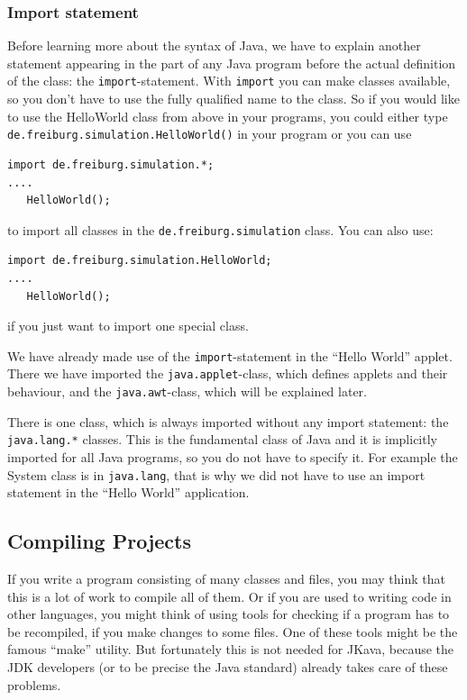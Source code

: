 \subsubsection{Import statement}
Before learning more about the syntax of Java, we have to explain another
statement appearing in the part of any Java program before the actual
definition of the class: the \verb|import|-statement. With \verb|import|
you can make classes available, so you don't have to use the fully
qualified name to the class. So if you would like to
use the HelloWorld class from above in your programs, you could either
type \verb|de.freiburg.simulation.HelloWorld()| in your program
or you can use
\begin{verbatim}
import de.freiburg.simulation.*;
....
   HelloWorld();
\end{verbatim}
to import all classes in the \verb|de.freiburg.simulation| class.
You can also use:
\begin{verbatim}
import de.freiburg.simulation.HelloWorld;
....
   HelloWorld();
\end{verbatim}
if you just want to import one special class.

We have already made use of the \verb|import|-statement in the ``Hello World'' 
applet. There we have imported the \verb|java.applet|-class, which
defines applets and their behaviour, and the \verb|java.awt|-class, which
will be explained later.
 
There is one class, which is always imported without any import statement:
the \verb|java.lang.*| classes. This is the fundamental class of Java and it is
implicitly imported for all Java programs, so you do not have to specify
it. For example the System class is in \verb|java.lang|, that is why
we did not have to use an import statement in the ``Hello World''
application.  


\subsection{Compiling Projects}
If you write a program consisting of many classes and files, you
may think that this is a lot of work to compile all of them. Or if
you are used to writing code in other languages, you might think
of using tools for checking if a program has to be recompiled, if you make
changes to some files. One of these tools might be the famous ``make''
utility. But fortunately this is not needed for JKava, because
the JDK developers (or to be precise the Java standard) already
takes care of these problems. 

